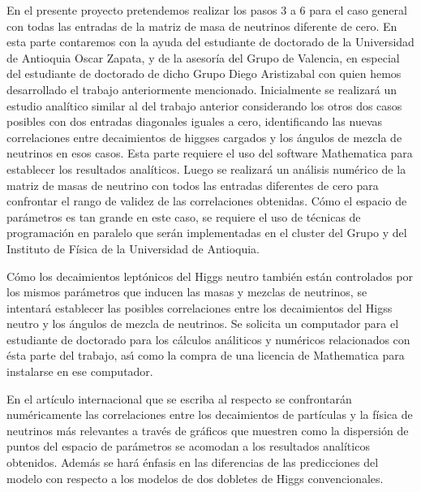 En el presente proyecto pretendemos realizar los pasos 3 a 6 para el
caso general con todas las entradas de la matriz de masa de neutrinos
diferente de cero. En esta parte contaremos con la ayuda del
estudiante de doctorado de la Universidad de Antioquia Oscar Zapata, y
de la asesoría del Grupo de Valencia, en especial del estudiante de
doctorado de dicho Grupo Diego Aristizabal con quien hemos
desarrollado el trabajo anteriormente mencionado.  Inicialmente se
realizará un estudio analítico similar al del trabajo anterior
considerando los otros dos casos posibles con dos entradas diagonales
iguales a cero, identificando las nuevas correlaciones entre
decaimientos de higgses cargados y los ángulos de mezcla de neutrinos
en esos casos. Esta parte requiere el uso del software Mathematica
para establecer los resultados analíticos.  Luego se realizará un
análisis numérico de la matriz de masas de neutrino con todos las
entradas diferentes de cero para confrontar el rango de validez de las
correlaciones obtenidas. Cómo el espacio de parámetros es tan grande
en este caso, se requiere el uso de técnicas de programación en
paralelo que serán implementadas en el cluster del Grupo y del
Instituto de Física de la Universidad de Antioquia.

Cómo los decaimientos leptónicos del Higgs neutro también están
controlados por los mismos parámetros que inducen las masas y mezclas
de neutrinos, se intentará establecer las posibles correlaciones entre
los decaimientos del Higss neutro y los ángulos de mezcla de
neutrinos. Se solicita un computador para el estudiante de doctorado
para los cálculos análiticos y numéricos relacionados con ésta parte
del trabajo, as\'\i{} como la compra de una licencia de Mathematica para
instalarse en ese computador.

En el artículo internacional que se escriba al respecto se
confrontarán numéricamente las correlaciones entre los decaimientos de
partículas y la física de neutrinos más relevantes a través de
gráficos que muestren como la dispersión de puntos del espacio de
parámetros se acomodan a los resultados analíticos obtenidos. Además
se hará énfasis en las diferencias de las predicciones del modelo con
respecto a los modelos de dos dobletes de Higgs convencionales. 


